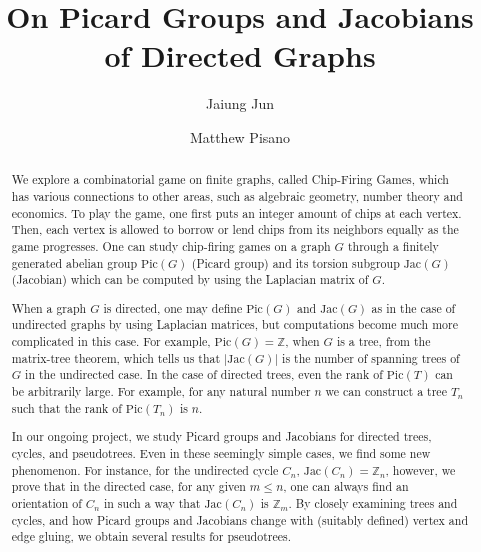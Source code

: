 \documentclass[11pt,reqno]{amsart}
\theoremstyle{definition}
\theoremstyle{plain}
\begin{document}
\title{On Picard Groups and Jacobians of Directed Graphs}

\author{Jaiung Jun}
\address{Department of Mathematics, State University of New York at New Paltz, NY 12561, USA}

\author{Matthew Pisano}
\address{Department of Mathematics, State University of New York at New Paltz, NY 12561, USA}

\makeatletter
{}
\makeatother


\begin{abstract}
	We explore a combinatorial game on finite graphs, called Chip-Firing Games,
	which has various connections to other areas, such as algebraic geometry, number theory and economics.
	To play the game, one first puts an integer amount of chips at each vertex. Then,
	each vertex is allowed to borrow or lend chips from its neighbors equally as the game progresses.
	One can study chip-firing games on a graph $G$ through a finitely generated abelian group
	$\textrm{Pic}(G)$ (Picard group) and its torsion subgroup $\textrm{Jac}(G)$ (Jacobian) which can
	be computed by using the Laplacian matrix of $G$.

	When a graph $G$ is directed, one may define $\textrm{Pic}(G)$ and $\textrm{Jac}(G)$ as in the case of undirected
	graphs by using Laplacian matrices, but computations become much more complicated in this case. For example,
	$\textrm{Pic}(G)=\mathbb{Z}$, when $G$ is a tree, from the matrix-tree theorem, which tells us that $|\textrm{Jac}(G)|$ is
	the number of spanning trees of $G$ in the undirected case.
	In the case of directed trees, even the rank of $\textrm{Pic}(T)$ can be arbitrarily large.
	For example, for any natural number $n$ we can construct a tree $T_n$ such that the rank of $\textrm{Pic}(T_n)$ is $n$.

	In our ongoing project, we study Picard groups and Jacobians for directed trees, cycles, and pseudotrees.
	Even in these seemingly simple cases, we find some new phenomenon. For instance, for the undirected cycle $C_n$,
	$\textrm{Jac}(C_n)=\mathbb{Z}_n$, however, we prove that in the directed case, for any given $m \leq n$, one can
	always find an orientation of $C_n$ in such a way that $\textrm{Jac}(C_n)$ is $\mathbb{Z}_m$.
	By closely examining trees and cycles, and how Picard groups and Jacobians change with (suitably defined)
	vertex and edge gluing, we obtain several results for pseudotrees.
\end{abstract}

\maketitle
\end{document}
